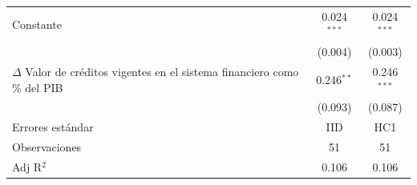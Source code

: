 \begin{tabular}{lcc}
   Constante                                                                                        & 0.024$^{***}$ & 0.024$^{***}$\\   
                                                                                                   & (0.004)       & (0.003)\\   
   \makecell{$\Delta$ Valor de créditos vigentes \\ en el sistema financiero como \% del PIB}      & 0.246$^{**}$  & 0.246$^{***}$\\   
                                                                                                   & (0.093)       & (0.087)\\   
   Errores estándar                                                                                 & IID           & HC1 \\   
   Observaciones                                                                                    & 51            & 51\\  
   Adj R$^2$                                                                                  & 0.106         & 0.106\\  
 \midrule \midrule
\end{tabular}
\par\endgroup
